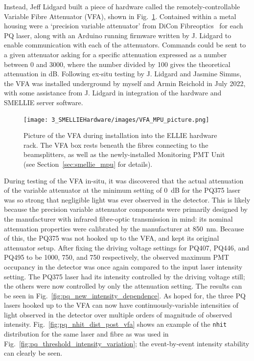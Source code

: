 Instead, Jeff Lidgard built a piece of hardware called the remotely-controllable Variable Fibre Attenuator (VFA), shown in Fig.~\ref{fig:vfa_picture}. Contained within a metal housing were a `precision variable attenuator' from DiCon Fibreoptics~\cite{diconfibreoptics30dBPrecisionVariable2017} %
for each PQ laser, along with an Arduino running firmware written by J. Lidgard to enable communication with each of the attenuators. Commands could be sent to a given attenuator asking for a specific attenuation expressed as a number between 0 and 3000, where the number divided by 100 gives the theoretical attenuation in \si{\dB}. Following ex-situ testing by J. Lidgard and Jasmine Simms, the VFA was installed underground by myself and Armin Reichold in July 2022, with some assistance from J. Lidgard in integration of the hardware and SMELLIE server software.

\begin{figure}
    \centering
    \texttt{[image: 3\_SMELLIEHardware/images/VFA\_MPU\_picture.png]}
    \caption[Picture of the VFA during installation into the ELLIE hardware rack]
    {Picture of the VFA during installation into the ELLIE hardware rack. The VFA box rests beneath the fibres connecting to the beamsplitters, as well as the newly-installed Monitoring PMT Unit (see Section~\ref{sec:smellie_mpu} for details).}
    \label{fig:vfa_picture}
\end{figure}

During testing of the VFA in-situ, it was discovered that the actual attenuation of the variable attenuator at the minimum setting of \SI{0}{\dB} for the PQ375 laser was so strong that negligible light was ever observed in the detector. This is likely because the precision variable attenuator components were primarily designed by the manufacturer with infrared fibre-optic transmission in mind: its nominal attenuation properties were calibrated by the manufacturer at \SI{850}{\nm}. Because of this, the PQ375 was not hooked up to the VFA, and kept its original attenuator setup. After fixing the driving voltage settings for PQ407, PQ446, and PQ495 to be 1000, 750, and 750 respectively, %
the observed maximum PMT occupancy in the detector was once again compared to the input laser intensity setting. The PQ375 laser had its intensity controlled by the driving voltage still; the others were now controlled by only the attenuation setting. The results can be seen in Fig.~\ref{fig:pq_new_intensity_dependence}. As hoped for, the three PQ lasers hooked up to the VFA can now have continuously-variable intensities of light observed in the detector over multiple orders of magnitude of observed intensity. Fig.~\ref{fig:pq_nhit_dist_post_vfa} shows an example of the \texttt{nhit} distribution for the same laser and fibre as was used in Fig.~\ref{fig:pq_threshold_intensity_variation}; the event-by-event intensity stability can clearly be seen.

